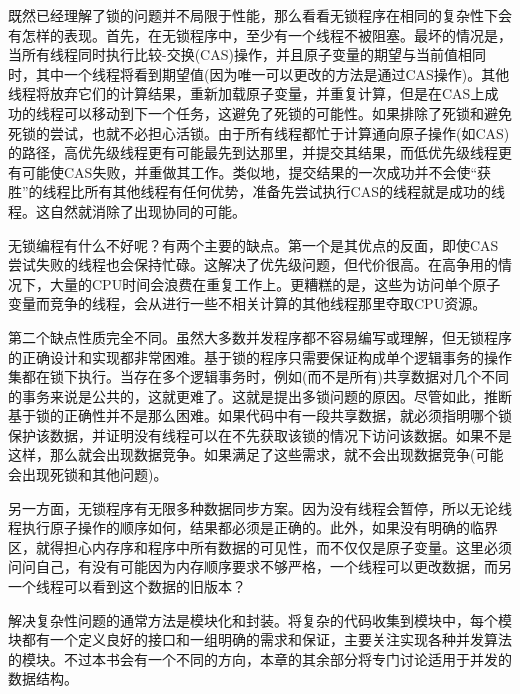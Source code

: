 既然已经理解了锁的问题并不局限于性能，那么看看无锁程序在相同的复杂性下会有怎样的表现。首先，在无锁程序中，至少有一个线程不被阻塞。最坏的情况是，当所有线程同时执行比较-交换(CAS)操作，并且原子变量的期望与当前值相同时，其中一个线程将看到期望值(因为唯一可以更改的方法是通过CAS操作)。其他线程将放弃它们的计算结果，重新加载原子变量，并重复计算，但是在CAS上成功的线程可以移动到下一个任务，这避免了死锁的可能性。如果排除了死锁和避免死锁的尝试，也就不必担心活锁。由于所有线程都忙于计算通向原子操作(如CAS)的路径，高优先级线程更有可能最先到达那里，并提交其结果，而低优先级线程更有可能使CAS失败，并重做其工作。类似地，提交结果的一次成功并不会使“获胜”的线程比所有其他线程有任何优势，准备先尝试执行CAS的线程就是成功的线程。这自然就消除了出现协同的可能。

无锁编程有什么不好呢？有两个主要的缺点。第一个是其优点的反面，即使CAS尝试失败的线程也会保持忙碌。这解决了优先级问题，但代价很高。在高争用的情况下，大量的CPU时间会浪费在重复工作上。更糟糕的是，这些为访问单个原子变量而竞争的线程，会从进行一些不相关计算的其他线程那里夺取CPU资源。

第二个缺点性质完全不同。虽然大多数并发程序都不容易编写或理解，但无锁程序的正确设计和实现都非常困难。基于锁的程序只需要保证构成单个逻辑事务的操作集都在锁下执行。当存在多个逻辑事务时，例如(而不是所有)共享数据对几个不同的事务来说是公共的，这就更难了。这就是提出多锁问题的原因。尽管如此，推断基于锁的正确性并不是那么困难。如果代码中有一段共享数据，就必须指明哪个锁保护该数据，并证明没有线程可以在不先获取该锁的情况下访问该数据。如果不是这样，那么就会出现数据竞争。如果满足了这些需求，就不会出现数据竞争(可能会出现死锁和其他问题)。

另一方面，无锁程序有无限多种数据同步方案。因为没有线程会暂停，所以无论线程执行原子操作的顺序如何，结果都必须是正确的。此外，如果没有明确的临界区，就得担心内存序和程序中所有数据的可见性，而不仅仅是原子变量。这里必须问问自己，有没有可能因为内存顺序要求不够严格，一个线程可以更改数据，而另一个线程可以看到这个数据的旧版本？

解决复杂性问题的通常方法是模块化和封装。将复杂的代码收集到模块中，每个模块都有一个定义良好的接口和一组明确的需求和保证，主要关注实现各种并发算法的模块。不过本书会有一个不同的方向，本章的其余部分将专门讨论适用于并发的数据结构。




































